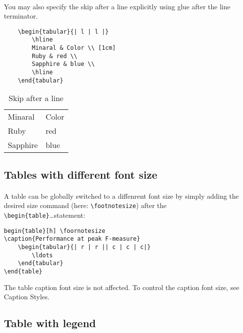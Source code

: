 \paragraph{}
You may also specify the skip after a line explicitly using glue after the line terminator.
\begin{verbatim}
	\begin{tabular}{| l | l |}
		\hline
		Minaral & Color \\ [1cm]
		Ruby & red \\
		Sapphire & blue \\
		\hline
	\end{tabular}
\end{verbatim}
\begin{table}[htbp]
	\centering
	\begin{tabular}{| l | l |}
		\hline
		Minaral & Color \\ [1cm]
		Ruby & red \\
		Sapphire & blue \\
		\hline
	\end{tabular}
	\caption{Skip after a line}
	\label{skipafterline}
\end{table}

\subsection{Tables with different font size}

\paragraph{}
A table can be globally switched to a diffenrent font size by simply adding the
desired size command (here: \verb|\footnotesize|) after the \\
\verb|\begin{table}|\ldots statement:
\begin{verbatim}
begin{table}[h] \foornotesize
\caption{Performance at peak F-measure}
	\begin{tabular}{| r | r || c | c | c|}
		\ldots
	\end{tabular}
\end{table}
\end{verbatim}

The table caption font size is not affected. To control the caption font size,
see Caption Styles.

\subsection{Table with legend}

